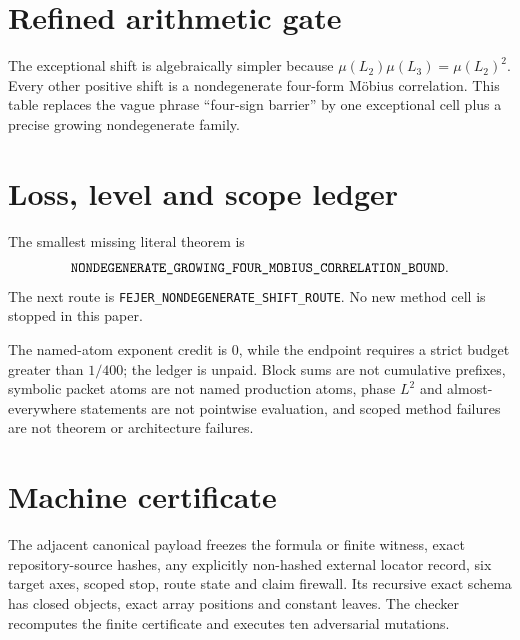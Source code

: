 \documentclass[11pt]{article}
\begin{document}
\section{Refined arithmetic gate}
The exceptional shift is algebraically simpler because
\(\mu(L_2)\mu(L_3)=\mu(L_2)^2\).  Every other positive shift is a
nondegenerate four-form M\"obius correlation.  This table replaces the vague
phrase ``four-sign barrier'' by one exceptional cell plus a precise growing
nondegenerate family.


\section{Loss, level and scope ledger}
The smallest missing literal theorem is
\[
\texttt{NONDEGENERATE\_\allowbreak{}GROWING\_\allowbreak{}FOUR\_\allowbreak{}MOBIUS\_\allowbreak{}CORRELATION\_\allowbreak{}BOUND}.
\]
The next route is \texttt{FEJER\_\allowbreak{}NONDEGENERATE\_\allowbreak{}SHIFT\_\allowbreak{}ROUTE}.
No new method cell is stopped in this paper.

The named-atom exponent credit is \(0\), while the endpoint requires a
strict budget greater than \(1/400\); the ledger is unpaid.  Block sums are
not cumulative prefixes, symbolic packet atoms are not named production
atoms, phase \(L^2\) and almost-everywhere statements are not pointwise
evaluation, and scoped method failures are not theorem or architecture
failures.

\section{Machine certificate}
The adjacent canonical payload freezes the formula or finite witness,
exact repository-source hashes, any explicitly non-hashed external locator
record, six target axes, scoped stop, route state and claim firewall.  Its
recursive exact schema has closed objects, exact array positions and
constant leaves.  The checker recomputes the finite certificate and executes
ten adversarial mutations.



\end{document}

